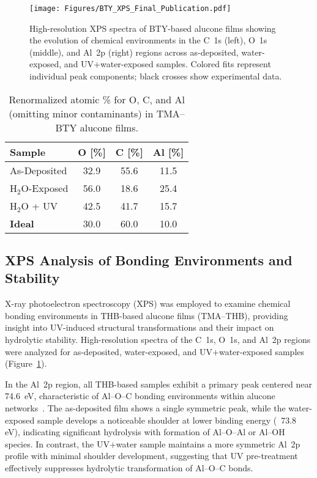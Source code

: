 \begin{figure}[H]
  \centering
  \texttt{[image: Figures/BTY\_XPS\_Final\_Publication.pdf]}
  \caption{High-resolution XPS spectra of BTY-based alucone films showing the evolution of chemical environments in the C~1s (left), O~1s (middle), and Al~2p (right) regions across as-deposited, water-exposed, and UV+water-exposed samples. Colored fits represent individual peak components; black crosses show experimental data.}
  \label{fig:xps_spectra}
\end{figure}



  \begin{table}[H]
  \centering
  \caption{Renormalized atomic \% for O, C, and Al (omitting minor contaminants) in TMA–BTY alucone films.}
  \label{tab:xps-renormalized}
  \begin{tabular}{l c c c}
    \toprule
    \textbf{Sample} & \textbf{O [\%]} & \textbf{C [\%]} & \textbf{Al [\%]} \\
    \midrule
    As-Deposited       & 32.9 & 55.6 & 11.5 \\
    \midrule[0.8pt]
    H$_2$O-Exposed     & 56.0 & 18.6 & 25.4 \\
    \midrule[0.8pt]
    H$_2$O + UV        & 42.5 & 41.7 & 15.7 \\
    \midrule[0.8pt]
    \textbf{Ideal}     & 30.0 & 60.0 & 10.0 \\
    \bottomrule
  \end{tabular}
\end{table}


\subsection{XPS Analysis of Bonding Environments and Stability}

X-ray photoelectron spectroscopy (XPS) was employed to examine chemical bonding environments in THB-based alucone films (TMA–THB), providing insight into UV-induced structural transformations and their impact on hydrolytic stability. High-resolution spectra of the C~1s, O~1s, and Al~2p regions were analyzed for as-deposited, water-exposed, and UV+water-exposed samples (Figure~\ref{fig:xps_spectra}).

In the Al~2p region, all THB-based samples exhibit a primary peak centered near 74.6~eV, characteristic of Al–O–C bonding environments within alucone networks~\cite{REF}. The as-deposited film shows a single symmetric peak, while the water-exposed sample develops a noticeable shoulder at lower binding energy (~73.8 eV), indicating significant hydrolysis with formation of Al–O–Al or Al–OH species. In contrast, the UV+water sample maintains a more symmetric Al~2p profile with minimal shoulder development, suggesting that UV pre-treatment effectively suppresses hydrolytic transformation of Al–O–C bonds.

